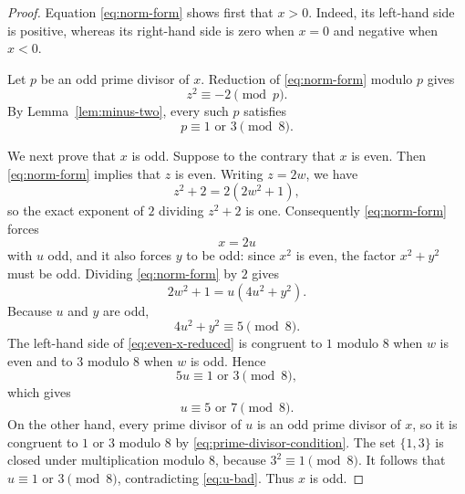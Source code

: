 \documentclass[11pt,a4paper]{amsart}
\theoremstyle{definition}
\numberwithin{equation}{section}
\begin{document}
\begin{proof}
Equation \eqref{eq:norm-form} shows first that \(x>0\).  Indeed, its left-hand side
is positive, whereas its right-hand side is zero when \(x=0\) and negative when
\(x<0\).

Let \(p\) be an odd prime divisor of \(x\).  Reduction of
\eqref{eq:norm-form} modulo \(p\) gives
\begin{equation}
 z^2\equiv-2\pmod p.
 \label{eq:p-divides-x}
\end{equation}
By Lemma~\ref{lem:minus-two}, every such \(p\) satisfies
\begin{equation}
 p\equiv1\text{ or }3\pmod8.
 \label{eq:prime-divisor-condition}
\end{equation}

We next prove that \(x\) is odd.  Suppose to the contrary that \(x\) is even.  Then
\eqref{eq:norm-form} implies that \(z\) is even.  Writing \(z=2w\), we have
\begin{equation}
 z^2+2=2(2w^2+1),
\end{equation}
so the exact exponent of \(2\) dividing \(z^2+2\) is one.  Consequently
\eqref{eq:norm-form} forces
\begin{equation}
 x=2u
 \label{eq:x-2u}
\end{equation}
with \(u\) odd, and it also forces \(y\) to be odd: since \(x^2\) is even, the factor
\(x^2+y^2\) must be odd.  Dividing \eqref{eq:norm-form} by \(2\) gives
\begin{equation}
 2w^2+1=u(4u^2+y^2).
 \label{eq:even-x-reduced}
\end{equation}
Because \(u\) and \(y\) are odd,
\begin{equation}
 4u^2+y^2\equiv5\pmod8.
\end{equation}
The left-hand side of \eqref{eq:even-x-reduced} is congruent to \(1\) modulo \(8\)
when \(w\) is even and to \(3\) modulo \(8\) when \(w\) is odd.  Hence
\begin{equation}
 5u\equiv1\text{ or }3\pmod8,
\end{equation}
which gives
\begin{equation}
 u\equiv5\text{ or }7\pmod8.
 \label{eq:u-bad}
\end{equation}
On the other hand, every prime divisor of \(u\) is an odd prime divisor of \(x\), so
it is congruent to \(1\) or \(3\) modulo \(8\) by
\eqref{eq:prime-divisor-condition}.  The set \(\{1,3\}\) is closed under
multiplication modulo \(8\), because \(3^2\equiv1\pmod8\).  It follows that
\(u\equiv1\) or \(3\pmod8\), contradicting \eqref{eq:u-bad}.  Thus \(x\) is odd.


\end{proof}
\end{document}
